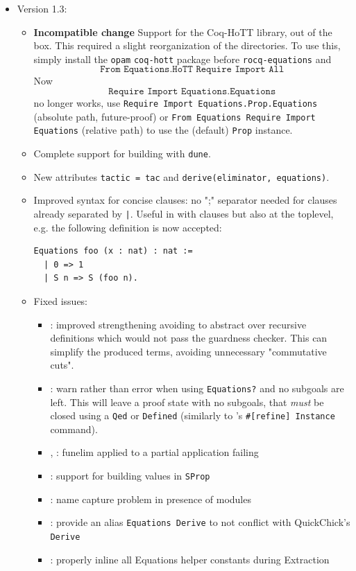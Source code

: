 \begin{itemize}
\item Version 1.3: 
  \begin{itemize}
  \item \textbf{Incompatible change} Support for the Coq-HoTT library, out of the box. This required a slight reorganization 
    of the directories. To use this, simply install the \texttt{opam} \texttt{coq-hott} package before 
    \texttt{rocq-equations} and \[\texttt{From Equations.HoTT Require Import All}\]
    Now \[\texttt{Require Import Equations.Equations}\] no longer works, 
    use \texttt{Require Import Equations.Prop.Equations} (absolute path, future-proof) or 
    \texttt{From Equations Require Import Equations} (relative path) to use the 
    (default) \texttt{Prop} instance.

  \item Complete support for building with \texttt{dune}.

  \item New attributes \texttt{tactic = tac} and \texttt{derive(eliminator, equations)}.
  \item Improved syntax for concise clauses: no ";" separator needed for clauses 
    already separated by \texttt{|}. Useful in with clauses but also at the toplevel, e.g.
    the following definition is now accepted:
\begin{verbatim} 
Equations foo (x : nat) : nat :=
  | 0 => 1
  | S n => S (foo n).
\end{verbatim}
  \item Fixed issues:
    \begin{itemize}
    \item {}: improved strengthening avoiding to abstract over recursive definitions
      which would not pass the guardness checker. This can simplify the produced terms, avoiding 
      unnecessary "commutative cuts".
    \item {}: warn rather than error when using \texttt{Equations?} and no subgoals are left.
      This will leave a proof state with no subgoals, that \emph{must} be closed using a \texttt{Qed} 
      or \texttt{Defined} (similarly to \Coq's \texttt{\#[refine] Instance} command).
    \item {}, : funelim applied to a partial application failing
    \item {}: support for building values in \texttt{SProp}
    \item {}: name capture problem in presence of modules
    \item {}: provide an alias \texttt{Equations Derive} to not conflict with QuickChick's \texttt{Derive}
    \item {}: properly inline all Equations helper constants during Extraction
\end{itemize}
\end{itemize}


\end{itemize}
